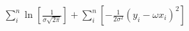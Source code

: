 \documentclass[preview]{standalone}
\begin{document}
\begin{align*}
\sum_i^n \ln [ \frac{1}{\sigma \sqrt{2 \pi}} ] + \sum_i^n [ -\frac{1}{2\sigma^2}(y_i -\omega x_i)^2 ]
\end{align*}
\end{document}
